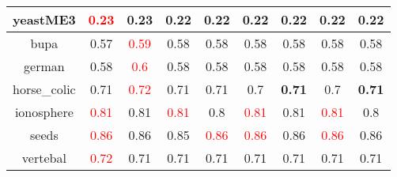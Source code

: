 \documentclass{article}%
\begin{document}
\begin{tabular}{c|cccccccc}
\hline%
yeastME3&\textcolor{red}{ 
0.23
}&0.23&0.22&0.22&0.22&0.22&0.22&0.22\\%
\hline%
bupa&0.57&\textcolor{red}{ 
0.59
}&0.58&0.58&0.58&0.58&0.58&0.58\\%
\hline%
german&0.58&\textcolor{red}{ 
0.6
}&0.58&0.58&0.58&0.58&0.58&0.58\\%
\hline%
horse\_colic&0.71&\textcolor{red}{ 
0.72
}&0.71&0.71&0.7&\textbf{0.71}&0.7&\textbf{0.71}\\%
\hline%
ionosphere&\textcolor{red}{ 
0.81
}&0.81&\textcolor{red}{ 
0.81
}&0.8&\textcolor{red}{ 
0.81
}&0.81&\textcolor{red}{ 
0.81
}&0.8\\%
\hline%
seeds&\textcolor{red}{ 
0.86
}&0.86&0.85&\textcolor{red}{ 
0.86
}&\textcolor{red}{ 
0.86
}&0.86&\textcolor{red}{ 
0.86
}&0.86\\%
\hline%
vertebal&\textcolor{red}{ 
0.72
}&0.71&0.71&0.71&0.71&0.71&0.71&0.71\\%
\hline%
\end{tabular}

%
\end{document}
